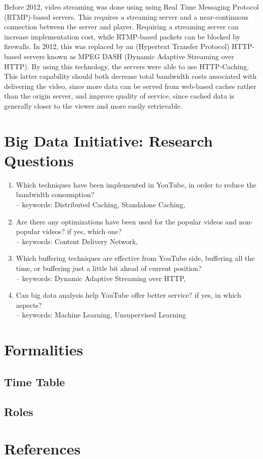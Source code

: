 \documentclass[a4paper,10pt]{article}
\begin{document}
Before 2012, video streaming was done using using Real Time Messaging Protocol (RTMP)-based servers. This requires a streaming server and a near-continuous connection between the server and player. Requiring a streaming server can increase implementation cost, while RTMP-based packets can be blocked by firewalls. In 2012, this was replaced by an (Hypertext Transfer Protocol) HTTP-based servers known as MPEG DASH (Dynamic Adaptive Streaming over HTTP).  By using this technology, the servers were able to use HTTP-Caching. This latter capability should both decrease total bandwidth costs associated with delivering the video, since more data can be served from web-based caches rather than the origin server, and improve quality of service, since cached data is generally closer to the viewer and more easily retrievable.
\section{Big Data Initiative: Research Questions}
\begin{enumerate}
\item Which techniques have been implemented in YouTube, in order to reduce the bandwidth consumption?\\
-- keywords: Distributed Caching, Standalone Caching,
\item Are there any optimizations have been used for the popular videos and non-popular videos? if yes, which one?\\
-- keywords: Content Delivery Network,
\item Which buffering techniques are effective from YouTube side, buffering all the time, or buffering just a little bit ahead of current position?\\
-- keywords: Dynamic Adaptive Streaming over HTTP,
\item Can big data analysis help YouTube offer better service? if yes, in which aspects?\\
-- keywords: Machine Learning, Unsupervised Learning
\end{enumerate}
\section{Formalities}
\subsection{Time Table}
\subsection{Roles}

\renewcommand\refname{\vskip -1cm}
\section{References}

\end{document}
